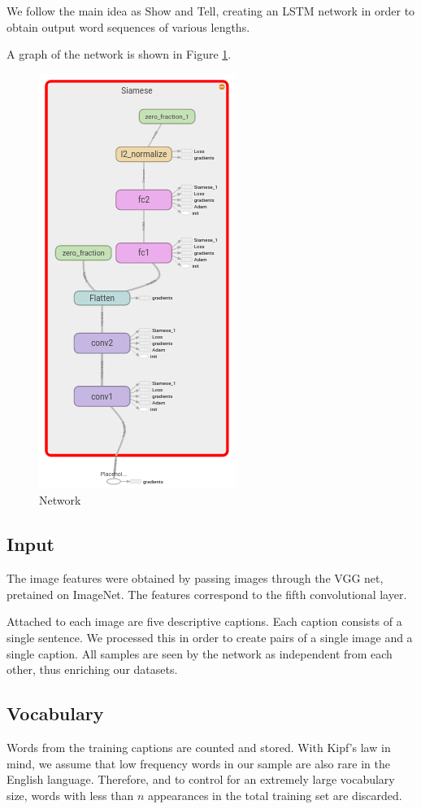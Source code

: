 \documentclass{article}
\begin{document}
We follow the main idea as Show and Tell, creating an LSTM network in order to  obtain output word sequences of various lengths. 

A graph of the network is shown in Figure \ref{fig:model}.

\begin{figure}[H]
  \centering
  \includegraphics[width=.36\linewidth]{./images/model.png}
  \caption{Network}
  \label{fig:model}
\end{figure}

\subsection{Input}
The image features were obtained by passing images through the VGG net, pretained on ImageNet. The features correspond to the fifth convolutional layer. 

Attached to each image are five descriptive captions. Each caption consists of a single sentence. We processed this in order to create pairs of a single image and a single caption. All samples are seen by the network as independent from each other, thus enriching our datasets. 


\subsection{Vocabulary}
Words from the training captions are counted and stored. With Kipf's law in mind, we assume that low frequency words in our sample are also rare in the English language. Therefore, and to control for an extremely large vocabulary size, words with less than $n$ appearances in the total training set are discarded.
\end{document}
